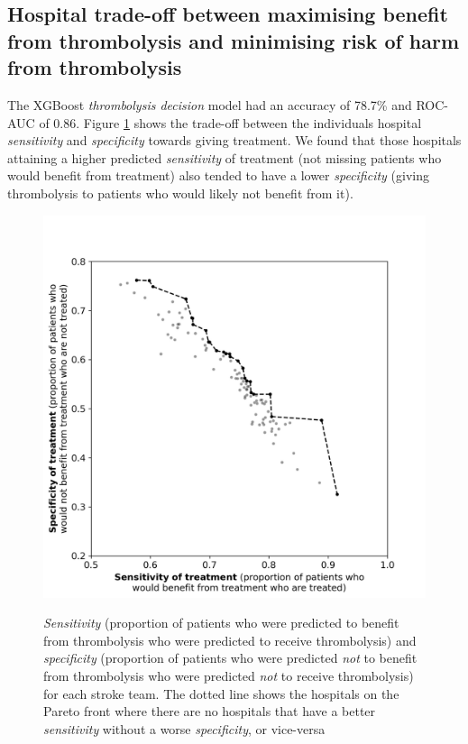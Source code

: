 \subsection{Hospital trade-off between maximising benefit from thrombolysis and minimising risk of harm from thrombolysis}

The XGBoost \textit{thrombolysis decision} model had an accuracy of 78.7\% and ROC-AUC of 0.86. Figure \ref{fig:hosp_shap_scatter} shows the trade-off between the individuals hospital \textit{sensitivity} and \textit{specificity} towards giving treatment. We found that those hospitals attaining a higher predicted \textit{sensitivity} of treatment (not missing patients who would benefit from treatment) also tended to have a lower \textit{specificity} (giving thrombolysis to patients who would likely not benefit from it).


\begin{figure}
    \centering
    {\includegraphics[width=0.65\linewidth]{./images/p4_spec_sens}} 
    \caption{\textit{Sensitivity} (proportion of patients who were predicted to benefit from thrombolysis who were predicted to receive thrombolysis) and \textit{specificity} (proportion of patients who were predicted \textit{not} to benefit from thrombolysis who were predicted \textit{not} to receive thrombolysis) for each stroke team. The dotted line shows the hospitals on the Pareto front where there are no hospitals that have a better \textit{sensitivity} without a worse \textit{specificity}, or vice-versa }
    \label{fig:hosp_shap_scatter}
\end{figure}


